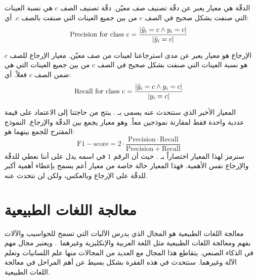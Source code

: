 الدقّة  هي معيار يعبر عن دقّة تصنيف صف معيّن.
دقّة تصنيف الصف $c$ هي نسبة العينات التي صنفت بشكل صحيح في الصف $c$ من بين جميع العينات التي صنفت بالصف $c$.
أي:
$$ \mathrm{Precision\ for\ class\ c} = \frac{ \left\vert \hat{y}_i = c \wedge y_i = c \right\vert }
{ \left\vert \hat{y}_i = c \right\vert } $$

الإرجاع  هو معيار يعبر عن مدى استرجاعنا لعينات من صف معيّن.
معيار الإرجاع للصف $c$ هو نسبة العينات التي صنفت بشكل صحيح في الصف $c$ من بين جميع العينات التي هي ضمن الصف $c$ فعلاً.
أي:
$$ \mathrm{Recall\ for\ class\ c} =
\frac{ \left\vert \hat{y}_i = c \wedge y_i = c \right\vert }{ \left\vert y_i = c \right\vert } $$

المعيار الأخير الذي سنتحدث عنه يسمى بـ .
ينتج من حاجتنا إلى الاعتماد على قيمة عددية واحدة فقط لمقارنة نموذجين معاً.
وهو معيار يجمع بين الدقّة والإرجاع.
النموذج المقترح للجمع بينهما هو:
$$ \mathrm{F1-score} = 2 \cdot \frac{ \mathrm{Precision} \cdot \mathrm{Recall}}
{\mathrm{Precision} + \mathrm{Recall}} $$
سنرمز لهذا المعيار اختصاراً بـ .
حيث أن الرقم $1$ في اسمه يدل على أننا نعطي للدقّة والإرجاع نفس الأهمية.
فهذا المعيار حالة خاصة من معيار أعم يسمح بإعطاء أهمية أكبر للدقّة على الإرجاع وبالعكس، ولكن لن نتحدث عنه.



\section{معالجة اللغات الطبيعية}
معالجة اللغات الطبيعية
هو المجال الذي يدرس الآليات التي تسمح للحواسيب والآلات بفهم ومعالجة اللغات الطبيعية مثل اللغة العربية والإنكليزية وغيرهما~\cite{riad2017}.
ويعتبر مجال مهم في الذكاء الصنعي.
يتقاطع هذا المجال مع العديد من المجالات منها علم اللسانيات وتعلم الآلة وغيرهما.
سنتحدث في هذه الفقرة بشكل بسيط عن أهم المراحل في معالجة اللغات الطبيعية.

